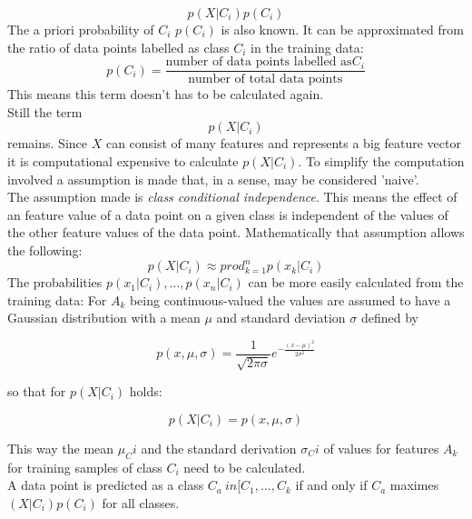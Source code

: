 \begin{equation} \label{eq:nb3}
p(X|C_i) p(C_i)
\end{equation}
The a priori probability of $C_i$  $p(C_i)$ is also known. It can be approximated from the ratio of data points labelled as class $C_i$ in the training data:
\begin{equation} \label{eq:nb4}
p(C_i)=\frac{\text{number of data points labelled as}C_i}{\text{number of total data points}}
\end{equation}
This means this term doesn't has to be calculated again.
\\
Still the term
\begin{equation} \label{eq:nb5}
p(X|C_i)
\end{equation}
remains. Since $X$ can consist of many features and represents a big feature vector it is computational expensive to calculate $p(X|C_i)$. To simplify the computation involved a assumption is made that, in a sense, may be considered 'naive'.
\\
The assumption made is \emph{class conditional independence}. This means the effect of an feature value of a data point on a given class is independent of the values of the other feature values of the data point. Mathematically that assumption allows the following:
\begin{equation} \label{eq:nb6}
p(X|C_i) \approx prod_{k=1}^{n} p(x_k|C_i)
\end{equation}
The probabilities $p(x_1|C_i), ... ,p(x_n|C_i)$ can be more easily calculated from the training data:
For $A_k$ being continuous-valued the values are assumed to have a Gaussian distribution with a mean $\mu$ and standard deviation $\sigma$ defined by

\begin{equation} \label{eq:nb7}
p(x,\mu ,\sigma) = \frac{1}{\sqrt{2\pi \sigma}}e^{-\frac{(x-\mu )^2}{2\sigma ^2}}
\end{equation}

so that for $p(X|C_i)$ holds:

\begin{equation} \label{eq:nb8}
p(X|C_i) = p(x,\mu ,\sigma)
\end{equation}

This way the mean $\mu_Ci$ and the standard derivation $\sigma_Ci$ of values for features $A_k$ for training samples of class $C_i$ need to be calculated.
\\

A data point is predicted as a class $C_a \ in [C_1,...,C_k$ if and only if $C_a$ maximes $(X|C_i) p(C_i)$  for all classes.  

